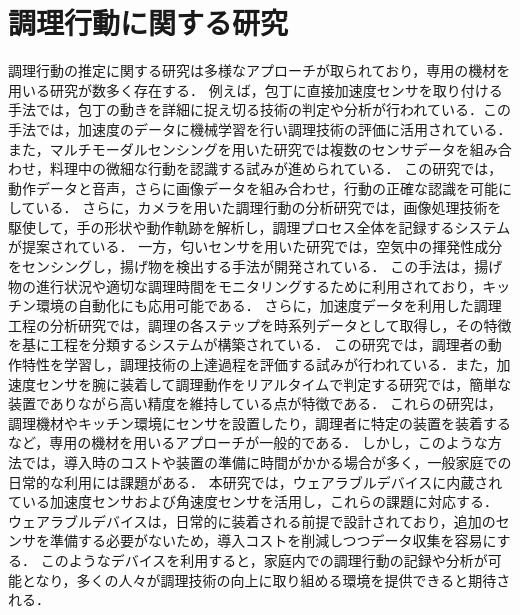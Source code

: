\section{調理行動に関する研究}
調理行動の推定に関する研究は多様なアプローチが取られており，専用の機材を用いる研究が数多く存在する．
例えば，包丁に直接加速度センサを取り付ける手法では，包丁の動きを詳細に捉え切る技術の判定や分析が行われている．この手法では，加速度のデータに機械学習を行い調理技術の評価に活用されている\cite{加速度センサを用いた包丁技術向上支援システムの提案}．
また，マルチモーダルセンシングを用いた研究では複数のセンサデータを組み合わせ，料理中の微細な行動を認識する試みが進められている．
この研究では，動作データと音声，さらに画像データを組み合わせ，行動の正確な認識を可能にしている\cite{マルチモーダルセンシングに基づく料理中のマイクロ行動認識の提案}．
さらに，カメラを用いた調理行動の分析研究では，画像処理技術を駆使して，手の形状や動作軌跡を解析し，調理プロセス全体を記録するシステムが提案されている\cite{Cooking Activities Recognition in Egocentric Videos Using Hand Shape Feature with Openpose}．
一方，匂いセンサを用いた研究では，空気中の揮発性成分をセンシングし，揚げ物を検出する手法が開発されている．
この手法は，揚げ物の進行状況や適切な調理時間をモニタリングするために利用されており，キッチン環境の自動化にも応用可能である\cite{NOSE: A Novel Odor Sensing Engine for Ambient Monitoring of the Frying Cooking Method in Kitchen Environments}．
さらに，加速度データを利用した調理工程の分析研究では，調理の各ステップを時系列データとして取得し，その特徴を基に工程を分類するシステムが構築されている．
この研究では，調理者の動作特性を学習し，調理技術の上達過程を評価する試みが行われている\cite{A dataset for complex activity recognition with micro and macro activities in a cooking scenario}．また，加速度センサを腕に装着して調理動作をリアルタイムで判定する研究では，簡単な装置でありながら高い精度を維持している点が特徴である\cite{手首装着型の加速度センサを用いた実時間調理行動認識手法の実現}．
これらの研究は，調理機材やキッチン環境にセンサを設置したり，調理者に特定の装置を装着するなど，専用の機材を用いるアプローチが一般的である．
しかし，このような方法では，導入時のコストや装置の準備に時間がかかる場合が多く，一般家庭での日常的な利用には課題がある．
本研究では，ウェアラブルデバイスに内蔵されている加速度センサおよび角速度センサを活用し，これらの課題に対応する．
ウェアラブルデバイスは，日常的に装着される前提で設計されており，追加のセンサを準備する必要がないため，導入コストを削減しつつデータ収集を容易にする．
このようなデバイスを利用すると，家庭内での調理行動の記録や分析が可能となり，多くの人々が調理技術の向上に取り組める環境を提供できると期待される．

